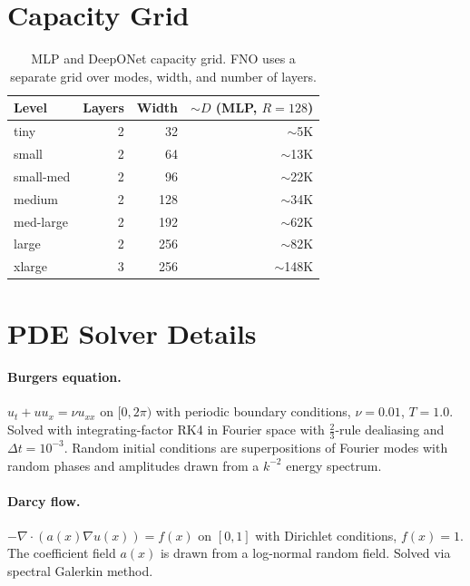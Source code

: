 \documentclass[11pt]{article}
\begin{document}
\appendix

\section{Capacity Grid}
\label{app:capacity}

\begin{table}[h]
\centering
\caption{MLP and DeepONet capacity grid. FNO uses a separate grid
over modes, width, and number of layers.}
\label{tab:capacity-grid}
\begin{tabular}{@{}lrrr@{}}
\toprule
\textbf{Level} & \textbf{Layers} & \textbf{Width} &
$\sim D$ \textbf{(MLP, $R{=}128$)} \\
\midrule
tiny      & 2 & 32  & $\sim$5K \\
small     & 2 & 64  & $\sim$13K \\
small-med & 2 & 96  & $\sim$22K \\
medium    & 2 & 128 & $\sim$34K \\
med-large & 2 & 192 & $\sim$62K \\
large     & 2 & 256 & $\sim$82K \\
xlarge    & 3 & 256 & $\sim$148K \\
\bottomrule
\end{tabular}
\end{table}


\section{PDE Solver Details}
\label{app:solvers}

\paragraph{Burgers equation.}
$u_t + u u_x = \nu u_{xx}$ on $[0, 2\pi)$ with periodic boundary
conditions, $\nu = 0.01$, $T = 1.0$. Solved with integrating-factor
RK4 in Fourier space with $\frac{2}{3}$-rule dealiasing and
$\Delta t = 10^{-3}$. Random initial conditions are superpositions of
Fourier modes with random phases and amplitudes drawn from a $k^{-2}$
energy spectrum.

\paragraph{Darcy flow.}
$-\nabla \cdot (a(x) \nabla u(x)) = f(x)$ on $[0, 1]$ with Dirichlet
conditions, $f(x) = 1$. The coefficient field $a(x)$ is drawn from
a log-normal random field. Solved via spectral Galerkin method.
\end{document}
